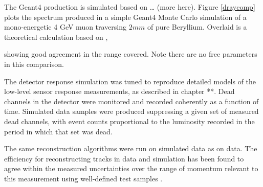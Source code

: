 The Geant4 \deltaray production is simulated based on … (more here).  Figure
\ref{draycomp} plots the \deltaray spectrum produced in a simple Geant4 Monte
Carlo simulation of a mono-energetic 4 GeV muon traversing $2 mm$ of pure
Beryllium.  Overlaid is a theoretical calculation based on \cite{drtheory},

showing good agreement in the range covered.  Note there are no free parameters
in this comparison.

The \babar detector response simulation was tuned to reproduce detailed models
of the low-level sensor response measurements, as described in \cite{babarnim2} chapter **.
Dead channels in the detector were monitored and recorded coherently as a
function of time.  Simulated data samples were produced suppressing a given set
of measured dead channels, with event counts proportional to the luminosity
recorded in the period in which that set was dead.

The same reconstruction algorithms were run on simulated data as on \babar
data.  The efficiency for reconstructing tracks in \babar data and simulation
has been found to agree within the measured uncertainties over the range of
momentum relevant to this measurement using well-defined test samples
\cite{trackeff}.
